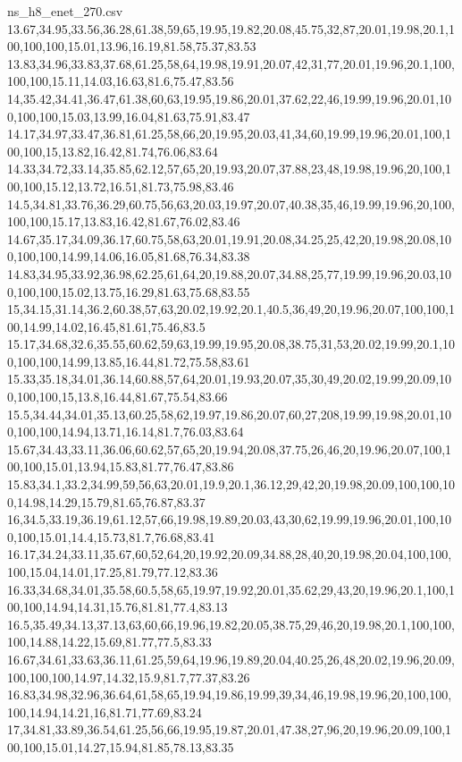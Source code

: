 \begin{filecontents*}[overwrite]{ns_h8_enet_270.csv}
13.67,34.95,33.56,36.28,61.38,59,65,19.95,19.82,20.08,45.75,32,87,20.01,19.98,20.1,100,100,100,15.01,13.96,16.19,81.58,75.37,83.53
13.83,34.96,33.83,37.68,61.25,58,64,19.98,19.91,20.07,42,31,77,20.01,19.96,20.1,100,100,100,15.11,14.03,16.63,81.6,75.47,83.56
14,35.42,34.41,36.47,61.38,60,63,19.95,19.86,20.01,37.62,22,46,19.99,19.96,20.01,100,100,100,15.03,13.99,16.04,81.63,75.91,83.47
14.17,34.97,33.47,36.81,61.25,58,66,20,19.95,20.03,41,34,60,19.99,19.96,20.01,100,100,100,15,13.82,16.42,81.74,76.06,83.64
14.33,34.72,33.14,35.85,62.12,57,65,20,19.93,20.07,37.88,23,48,19.98,19.96,20,100,100,100,15.12,13.72,16.51,81.73,75.98,83.46
14.5,34.81,33.76,36.29,60.75,56,63,20.03,19.97,20.07,40.38,35,46,19.99,19.96,20,100,100,100,15.17,13.83,16.42,81.67,76.02,83.46
14.67,35.17,34.09,36.17,60.75,58,63,20.01,19.91,20.08,34.25,25,42,20,19.98,20.08,100,100,100,14.99,14.06,16.05,81.68,76.34,83.38
14.83,34.95,33.92,36.98,62.25,61,64,20,19.88,20.07,34.88,25,77,19.99,19.96,20.03,100,100,100,15.02,13.75,16.29,81.63,75.68,83.55
15,34.15,31.14,36.2,60.38,57,63,20.02,19.92,20.1,40.5,36,49,20,19.96,20.07,100,100,100,14.99,14.02,16.45,81.61,75.46,83.5
15.17,34.68,32.6,35.55,60.62,59,63,19.99,19.95,20.08,38.75,31,53,20.02,19.99,20.1,100,100,100,14.99,13.85,16.44,81.72,75.58,83.61
15.33,35.18,34.01,36.14,60.88,57,64,20.01,19.93,20.07,35,30,49,20.02,19.99,20.09,100,100,100,15,13.8,16.44,81.67,75.54,83.66
15.5,34.44,34.01,35.13,60.25,58,62,19.97,19.86,20.07,60,27,208,19.99,19.98,20.01,100,100,100,14.94,13.71,16.14,81.7,76.03,83.64
15.67,34.43,33.11,36.06,60.62,57,65,20,19.94,20.08,37.75,26,46,20,19.96,20.07,100,100,100,15.01,13.94,15.83,81.77,76.47,83.86
15.83,34.1,33.2,34.99,59,56,63,20.01,19.9,20.1,36.12,29,42,20,19.98,20.09,100,100,100,14.98,14.29,15.79,81.65,76.87,83.37
16,34.5,33.19,36.19,61.12,57,66,19.98,19.89,20.03,43,30,62,19.99,19.96,20.01,100,100,100,15.01,14.4,15.73,81.7,76.68,83.41
16.17,34.24,33.11,35.67,60,52,64,20,19.92,20.09,34.88,28,40,20,19.98,20.04,100,100,100,15.04,14.01,17.25,81.79,77.12,83.36
16.33,34.68,34.01,35.58,60.5,58,65,19.97,19.92,20.01,35.62,29,43,20,19.96,20.1,100,100,100,14.94,14.31,15.76,81.81,77.4,83.13
16.5,35.49,34.13,37.13,63,60,66,19.96,19.82,20.05,38.75,29,46,20,19.98,20.1,100,100,100,14.88,14.22,15.69,81.77,77.5,83.33
16.67,34.61,33.63,36.11,61.25,59,64,19.96,19.89,20.04,40.25,26,48,20.02,19.96,20.09,100,100,100,14.97,14.32,15.9,81.7,77.37,83.26
16.83,34.98,32.96,36.64,61,58,65,19.94,19.86,19.99,39,34,46,19.98,19.96,20,100,100,100,14.94,14.21,16,81.71,77.69,83.24
17,34.81,33.89,36.54,61.25,56,66,19.95,19.87,20.01,47.38,27,96,20,19.96,20.09,100,100,100,15.01,14.27,15.94,81.85,78.13,83.35

\end{filecontents*}
